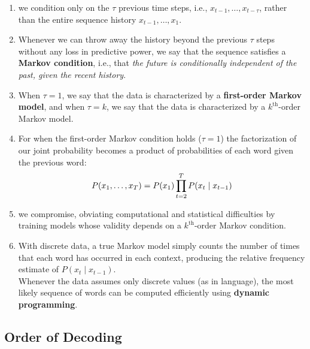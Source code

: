 \begin{enumerate}
    \item we condition only on the $\tau$ previous time steps, i.e., $x_{t-1}, \ldots, x_{t-\tau}$, rather than the entire sequence history $x_{t-1}, \ldots, x_1$.
    
    \item Whenever we can throw away the history beyond the previous $\tau$ steps without any loss in predictive power, we say that the sequence satisfies a \textbf{Markov condition}, i.e., that \textit{the future is conditionally independent of the past, given the recent history}. 
    
    \item When $\tau = 1$, we say that the data is characterized by a \textbf{first-order Markov model}, and when $\tau = k$, we say that the data is characterized by a $k^{\textrm{th}}$-order Markov model.
    
    \item For when the first-order Markov condition holds ($\tau = 1$) the factorization of our joint probability becomes a product of probabilities of each word given the previous word:
    \[
        \hfill
        P(x_1, \ldots, x_T) = P(x_1) \prod_{t=2}^T P(x_t \mid x_{t-1})
        \hfill
    \]

    \item we compromise, obviating computational and statistical difficulties by training models whose validity depends on a $k^{\textrm{th}}$-order Markov condition.

    \item With discrete data, a true Markov model simply counts the number of times that each word has occurred in each context, producing the relative frequency estimate of $P(x_t \mid x_{t-1})$.\\
    Whenever the data assumes only discrete values (as in language), the most likely sequence of words can be computed efficiently using \textbf{dynamic programming}.

\end{enumerate}

\subsection{Order of Decoding \cite{dnn-1}}

